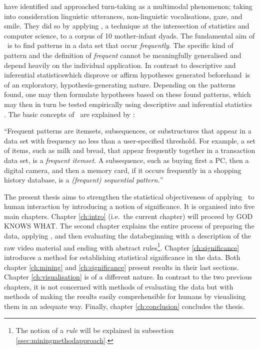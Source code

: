 \citet{rohlfing_multimodal_underreview} have identified and approached turn-taking as a multimodal phenomenon; taking into consideration linguistic utterances, non-linguistic vocalisations, gaze, and smile.
They did so by applying \fpmlower, a technique at the intersection of statistics and computer science, to a corpus of 10 mother-infant dyads.
The fundamental aim of \fpmlower\ is to find patterns in a data set that occur \emph{frequently}.
The specific kind of pattern and the definition of \emph{frequent} cannot be meaningfully generalised and depend heavily on the individual application.
In contrast to descriptive and inferential statistics\dash which disprove or affirm hypotheses generated beforehand\dash \fpmlower\ is of an exploratory, hypothesis-generating nature.
Depending on the patterns found, one may then formulate hypotheses based on these found patterns, which may then in turn be tested empirically using descriptive and inferential statistics \cite[]{rohlfing_multimodal_underreview,han_data_2012}. %
The basic concepts of \fpmlower\ are explained by \citet[, emphasis in original]{han_frequent_2007}:

\begin{customquote}
``Frequent patterns are itemsets, subsequences, or substructures that appear in a data set with frequency no less than a user-specified threshold.
For example, a set of items, such as milk and bread, that appear frequently together in a transaction data set, is a \emph{frequent itemset}.
A subsequence, such as buying first a PC, then a digital camera, and then a memory card, if it occurs frequently in a shopping history database, is a \emph{(frequent) sequential pattern.}''
\end{customquote}

The present thesis aims to strengthen the statistical objectiveness of applying \fpmlower\ to human interaction by introducing a notion of significance.
It is organised into five main chapters.
Chapter \ref{ch:intro} (i.e.\ the current chapter) will proceed by GOD KNOWS WHAT.
The second chapter explains the entire process of preparing the data, applying \fpmlower, and then evaluating the data\dash beginning with a description of the raw video material and ending with abstract rules\footnote{The notion of a \emph{rule} will be explained in subsection \ref{ssec:miningmethodapproach}.}.
Chapter \ref{ch:significance} introduces a method for establishing statistical significance in the data.
Both chapter \ref{ch:mining} and \ref{ch:significance} present results in their last sections.
Chapter \ref{ch:visualisation} is of a different nature.
In contrast to the two previous chapters, it is not concerned with methods of evaluating the data but with methods of making the results easily comprehensible for humans by visualising them in an adequate way.
Finally, chapter \ref{ch:conclusion} concludes the thesis.




